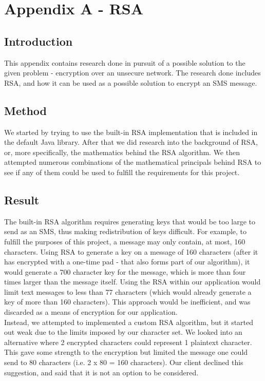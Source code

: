 \section{Appendix A - RSA}

\subsection*{Introduction}

This appendix contains research done in pursuit of a possible solution to the given problem - encryption over an unsecure network. The research done includes RSA, and how it can be used as a possible solution to encrypt an SMS message.

\subsection*{Method}

We started by trying to use the built-in RSA implementation that is included in the default Java library. After that we did research into the background of RSA, or, more specifically, the mathematics behind the RSA algorithm. We then attempted numerous combinations of the mathematical principals behind RSA to see if any of them could be used to fulfill the requirements for this project.

\subsection*{Result}

The built-in RSA algorithm requires generating keys that would be too large to send as an SMS, thus making redistribution of keys difficult. For example, to fulfill the purposes of this project, a message may only contain, at most, 160 characters. Using RSA to generate a key on a message of 160 characters (after it has encrypted with a one-time pad - that also forms part of our algorithm), it would generate a 700 character key for the message, which is  more than four times larger than the message itself. Using the RSA within our application would limit text messages to less than 77 characters (which would already generate a key of more than 160 characters). This approach would be inefficient, and was discarded as a means of encryption for our application.
\vspace{10pt}\\
Instead, we attempted to implemented a custom RSA algorithm, but it started out weak due to the limits imposed by our character set. We looked into an alternative where 2 encrypted characters could represent 1 plaintext character. This gave some strength to the encryption but limited the message one could send to 80 characters (i.e. 2 x 80 = 160 characters). Our client declined this suggestion, and said that it is not an option to be considered.

